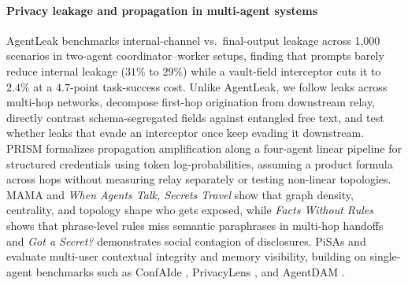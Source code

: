 \documentclass[preprint,12pt,authoryear]{elsarticle}
\begin{document}
\paragraph{Privacy leakage and propagation in multi-agent systems}
AgentLeak \citep{elyagoubi2026} benchmarks internal-channel vs.\ final-output leakage across 1{,}000 scenarios in two-agent coordinator--worker setups, finding that prompts barely reduce internal leakage ($31\%$ to $29\%$) while a vault-field interceptor cuts it to $2.4\%$ at a $4.7$-point task-success cost. Unlike AgentLeak, we follow leaks across multi-hop networks, decompose first-hop origination from downstream relay, directly contrast schema-segregated fields against entangled free text, and test whether leaks that evade an interceptor once keep evading it downstream. PRISM \citep{prism2026} formalizes propagation amplification along a four-agent linear pipeline for structured credentials using token log-probabilities, assuming a product formula across hops without measuring relay separately or testing non-linear topologies. MAMA \citep{liu2026} and \emph{When Agents Talk, Secrets Travel} \citep{ogundoyin2026} show that graph density, centrality, and topology shape who gets exposed, while \emph{Facts Without Rules} \citep{wang2026} shows that phrase-level rules miss semantic paraphrases in multi-hop handoffs and \emph{Got a Secret?} \citep{priyanshu2026} demonstrates social contagion of disclosures. PiSAs \citep{gupta2026} and \citet{hagag2026} evaluate multi-user contextual integrity and memory visibility, building on single-agent benchmarks such as ConfAIde \citep{mireshghallah}, PrivacyLens \citep{shao2024}, and AgentDAM \citep{zharmagambetov2025}.
\end{document}
